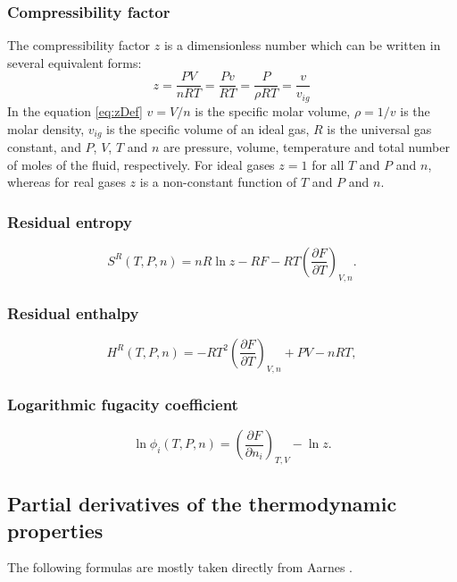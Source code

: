 \documentclass[english]{../thermomemo/thermomemo}
\newcommand{\dd}[2]{\frac{\partial #1}{\partial #2}}
\newcommand{\lp}{\left(}
\newcommand{\rp}{\right)}
\numberwithin{equation}{section}
\begin{document}
\subsubsection*{Compressibility factor}
\noindent
The compressibility factor $z$ is a dimensionless number which can be
written in several equivalent forms:
\begin{equation}
  \label{eq:zDef}
  z = \frac{PV}{nRT} = \frac{Pv}{RT} = \frac{P}{\rho RT}  = \frac{v}{v_{ig}}
\end{equation}
In the equation \eqref{eq:zDef} $v = V /n$ is the specific molar
volume, $\rho = 1/v$ is the molar density, $v_{ig}$ is the specific
volume of an ideal gas, $R$ is the universal gas constant, and $P$,
$V$, $T$ and $n$ are pressure, volume, temperature and total number of
moles of the fluid, respectively. For ideal gases $z=1$ for all $T$
and $P$ and $n$, whereas for real gases $z$ is a non-constant function
of $T$ and $P$ and $n$.

\subsubsection*{Residual entropy}
\begin{equation}
  \label{eq:Sres}
  S^R(T,P,n) = nR \ln z - RF - RT \lp \dd{F}{T} \rp_{V,n}. %
\end{equation}

\subsubsection*{Residual enthalpy}
\begin{equation}
  \label{eq:Hreduced}
  H^R(T,P,n) = -RT^2 \lp \dd{F}{T} \rp_{V,n} + PV - nRT, %
\end{equation}

\subsubsection*{Logarithmic fugacity coefficient}
\begin{equation}
  \label{eq:lnphireduced}
  \ln \phi_i(T,P,n) = \lp \dd{F}{n_i} \rp_{T,V} - \ln z. %
\end{equation}

\subsection{Partial derivatives of the thermodynamic properties}
The following formulas are mostly taken directly from Aarnes
\cite{Aarnes13}.
\end{document}
